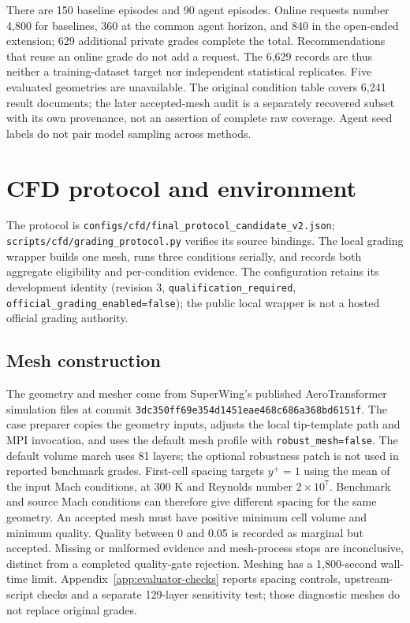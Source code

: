 There are 150 baseline episodes and 90 agent episodes. Online requests number
4{,}800 for baselines, 360 at the common agent horizon, and 840 in the open-ended
extension; 629 additional private grades complete the total. Recommendations
that reuse an online grade do not add a request. The 6{,}629 records are thus
neither a training-dataset target nor independent statistical replicates.
Five evaluated geometries are unavailable. The original condition table covers
6{,}241 result documents; the later accepted-mesh audit is a separately
recovered subset with its own provenance, not an assertion of complete raw
coverage. Agent seed labels do not pair model sampling across methods.

\section{CFD protocol and environment}
\label{app:cfdprotocol}

The protocol is
\texttt{configs/cfd/\allowbreak final\_protocol\_candidate\_v2.json};
\texttt{scripts/cfd/grading\_protocol.py} verifies its source bindings.
The local grading wrapper builds one mesh, runs three conditions serially,
and records both aggregate eligibility and per-condition evidence. The
configuration retains its development identity (revision 3,
\texttt{qualification\_required}, \texttt{official\_grading\_enabled=false});
the public local wrapper is not a hosted official grading authority.

\subsection{Mesh construction}

The geometry and mesher come from SuperWing's published AeroTransformer
simulation files at commit
\texttt{3dc350ff69e354d1451eae468c686a368bd6151f}. The case preparer copies the
geometry inputs, adjusts the local tip-template path and MPI invocation, and
uses the default mesh profile with \texttt{robust\_mesh=false}. The default
volume march uses 81 layers; the optional robustness patch is not used in
reported benchmark grades. First-cell spacing targets $y^+=1$ using the mean
of the input Mach conditions, at 300 K and Reynolds number $2\times10^7$.
Benchmark and source Mach conditions can therefore give different spacing for
the same geometry. An accepted mesh must have positive minimum cell
volume and minimum quality. Quality between 0 and 0.05 is recorded as marginal
but accepted. Missing or malformed evidence and mesh-process stops are
inconclusive, distinct from a completed quality-gate rejection. Meshing has
a 1{,}800-second wall-time limit. Appendix~\ref{app:evaluator-checks}
reports spacing controls, upstream-script checks and a separate 129-layer
sensitivity test; those diagnostic meshes do not replace original grades.

